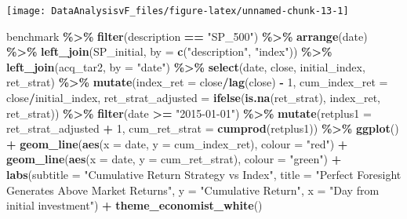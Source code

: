 \documentclass[
]{article}
\newenvironment{Shaded}{\begin{snugshade}}{\end{snugshade}}
\newcommand{\DataTypeTok}[1]{\textcolor[rgb]{0.13,0.29,0.53}{#1}}
\newcommand{\DecValTok}[1]{\textcolor[rgb]{0.00,0.00,0.81}{#1}}
\newcommand{\KeywordTok}[1]{\textcolor[rgb]{0.13,0.29,0.53}{\textbf{#1}}}
\newcommand{\NormalTok}[1]{#1}
\newcommand{\OperatorTok}[1]{\textcolor[rgb]{0.81,0.36,0.00}{\textbf{#1}}}
\newcommand{\StringTok}[1]{\textcolor[rgb]{0.31,0.60,0.02}{#1}}
\begin{document}
\begin{center}\texttt{[image: DataAnalysisvF\_files/figure-latex/unnamed-chunk-13-1]} \end{center}

\begin{Shaded}
\begin{Highlighting}[]
\NormalTok{benchmark }\OperatorTok{\%\textgreater{}\%}
\StringTok{  }\KeywordTok{filter}\NormalTok{(description }\OperatorTok{==}\StringTok{ "SP\_500"}\NormalTok{) }\OperatorTok{\%\textgreater{}\%}
\StringTok{  }\KeywordTok{arrange}\NormalTok{(date) }\OperatorTok{\%\textgreater{}\%}
\StringTok{  }\KeywordTok{left\_join}\NormalTok{(SP\_initial, }\DataTypeTok{by =} \KeywordTok{c}\NormalTok{(}\StringTok{"description"}\NormalTok{, }\StringTok{"index"}\NormalTok{)) }\OperatorTok{\%\textgreater{}\%}
\StringTok{  }\KeywordTok{left\_join}\NormalTok{(acq\_tar2, }\DataTypeTok{by =} \StringTok{"date"}\NormalTok{) }\OperatorTok{\%\textgreater{}\%}
\StringTok{  }\KeywordTok{select}\NormalTok{(date, close, initial\_index, ret\_strat) }\OperatorTok{\%\textgreater{}\%}
\StringTok{  }\KeywordTok{mutate}\NormalTok{(}\DataTypeTok{index\_ret =}\NormalTok{ close}\OperatorTok{/}\KeywordTok{lag}\NormalTok{(close) }\OperatorTok{{-}}\StringTok{ }\DecValTok{1}\NormalTok{,}
         \DataTypeTok{cum\_index\_ret =}\NormalTok{ close}\OperatorTok{/}\NormalTok{initial\_index,}
         \DataTypeTok{ret\_strat\_adjusted =} \KeywordTok{ifelse}\NormalTok{(}\KeywordTok{is.na}\NormalTok{(ret\_strat), index\_ret, ret\_strat)) }\OperatorTok{\%\textgreater{}\%}
\StringTok{  }\KeywordTok{filter}\NormalTok{(date }\OperatorTok{\textgreater{}=}\StringTok{ "2015{-}01{-}01"}\NormalTok{) }\OperatorTok{\%\textgreater{}\%}
\StringTok{  }\KeywordTok{mutate}\NormalTok{(}\DataTypeTok{retplus1 =}\NormalTok{ ret\_strat\_adjusted }\OperatorTok{+}\StringTok{ }\DecValTok{1}\NormalTok{,}
    \DataTypeTok{cum\_ret\_strat =} \KeywordTok{cumprod}\NormalTok{(retplus1)) }\OperatorTok{\%\textgreater{}\%}
\StringTok{  }\KeywordTok{ggplot}\NormalTok{() }\OperatorTok{+}
\StringTok{  }\KeywordTok{geom\_line}\NormalTok{(}\KeywordTok{aes}\NormalTok{(}\DataTypeTok{x =}\NormalTok{ date, }\DataTypeTok{y =}\NormalTok{ cum\_index\_ret), }\DataTypeTok{colour =} \StringTok{"red"}\NormalTok{) }\OperatorTok{+}
\StringTok{  }\KeywordTok{geom\_line}\NormalTok{(}\KeywordTok{aes}\NormalTok{(}\DataTypeTok{x =}\NormalTok{ date, }\DataTypeTok{y =}\NormalTok{ cum\_ret\_strat), }\DataTypeTok{colour =} \StringTok{"green"}\NormalTok{) }\OperatorTok{+}
\StringTok{  }\KeywordTok{labs}\NormalTok{(}\DataTypeTok{subtitle =} \StringTok{"Cumulative Return Strategy vs Index"}\NormalTok{,}
       \DataTypeTok{title =} \StringTok{"Perfect Foresight Generates Above Market Returns"}\NormalTok{,}
       \DataTypeTok{y =} \StringTok{"Cumulative Return"}\NormalTok{,}
       \DataTypeTok{x =} \StringTok{"Day from initial investment"}\NormalTok{) }\OperatorTok{+}\StringTok{ }
\StringTok{  }\KeywordTok{theme\_economist\_white}\NormalTok{()}
\end{Highlighting}
\end{Shaded}
\end{document}
